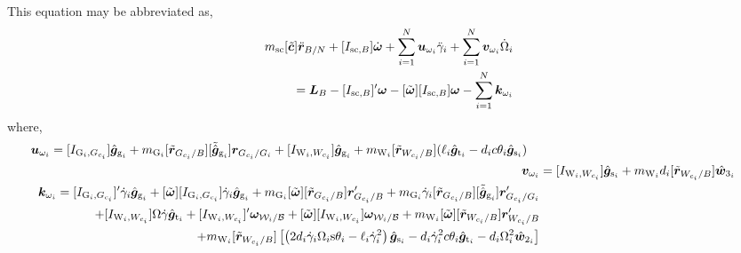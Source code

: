 This equation may be abbreviated as,
\begin{equation}
\begin{split}
m_{\text{\text{sc}}}[\tilde{\bm{c}}]\ddot{\bm r}_{B/N} + [I_{\text{sc},B}]\dot{\bm\omega} +  \sum\limits_{i=1}^{N}\bm{u}_{\omega_i}\ddot{\gamma}_i +  \sum\limits_{i=1}^{N}\bm{v}_{\omega_i}\dot{\Omega}_i \\= \bm{L}_B - [I_{\text{sc},B}]'\bm{\omega} - [\tilde{\bm\omega}][I_{\text{sc},B}]\bm\omega - \sum\limits_{i=1}^{N}\bm{k}_{\omega_i}
\end{split}
\label{eq:rotabbr}
\end{equation}
where,
\begin{align}
\begin{split}
\bm{u}_{\omega_i} &=  [I_{\text{G}_i,G_{c_i}}]\hat{\bm{g}}_{\text{g}_i} + m_{\text{G}_i}[\tilde{\bm{r}}_{G_{c_i}/B}][\tilde{\hat{\bm g}}_{\text{g}_i}]\bm{r}_{G_{c_i}/G_i} + [I_{\text{W}_i,W_{c_i}}]\hat{\bm{g}}_{\text{g}_i} + m_{\text{W}_i}[\tilde{\bm{r}}_{W_{c_i}/B}]( \ell_i\hat{\bm{g}}_{\text{t}_i} - d_ic\theta_i\hat{\bm{g}}_{\text{s}_i})
\end{split}
\\
\bm{v}_{\omega_i} &= [I_{\text{W}_i,W_{c_i}}]\hat{\bm{g}}_{\text{s}_i} + m_{\text{W}_i}d_i[\tilde{\bm{r}}_{W_{c_i}/B}]\hat{\bm w}_{3_i}
\\
\begin{split}
\bm{k}_{\omega_i} =  
[I_{\text{G}_i,G_{c_i}}]'\dot{\gamma}_i\hat{\bm{g}}_{\text{g}_i} + [\tilde{\bm\omega}][I_{\text{G}_i,G_{c_i}}]\dot{\gamma}_i\hat{\bm{g}}_{\text{g}_i} + m_{\text{G}_i}[\tilde{\bm{\omega}}][\tilde{\bm{r}}_{G_{c_i}/B}]\bm{r}'_{G_{c_i}/B}
+ m_{\text{G}_i}\dot{\gamma}_i[\tilde{\bm{r}}_{G_{c_i}/B}][\tilde{\hat{\bm g}}_{\text{g}_i}]\bm{r}'_{G_{c_i}/G_i}
\\+ [I_{\text{W}_i,W_{c_i}}]\Omega\dot{\gamma}\hat{\bm{g}}_{\text{t}_i} + [I_{\text{W}_i,W_{c_i}}]'\bm{\omega}_{\mathcal{W}_i/\cal B} + [\tilde{\bm{\omega}}][I_{\text{W}_i,W_{c_i}}]\bm{\omega}_{\mathcal{W}_i/\cal B} + m_{\text{W}_i}[\tilde{\bm{\omega}}][\tilde{\bm{r}}_{W_{c_i}/B}]\bm{r}'_{W_{c_i}/B} \\+ m_{\text{W}_i}[\tilde{\bm{r}}_{W_{c_i}/B}]\left[\left(2d_i\dot{\gamma}_i\Omega_i\text{s}\theta_i - \ell_i\dot{\gamma}_i^2\right)\hat{\bm{g}}_{\text{s}_i} - d_i\dot{\gamma}_i^2c\theta_i\hat{\bm{g}}_{\text{t}_i} - d_i\Omega_i^2 \hat{\bm{w}}_{2_i} \right]
\end{split}
\end{align}

